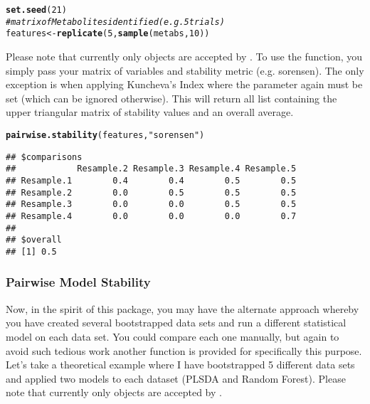\documentclass[12pt]{article}\usepackage[]{graphicx}\usepackage[usenames,dvipsnames]{color}
\makeatletter
\newcommand{\hlnum}[1]{\textcolor[rgb]{0.686,0.059,0.569}{#1}}%
\newcommand{\hlstr}[1]{\textcolor[rgb]{0.192,0.494,0.8}{#1}}%
\newcommand{\hlcom}[1]{\textcolor[rgb]{0.678,0.584,0.686}{\textit{#1}}}%
\newcommand{\hlstd}[1]{\textcolor[rgb]{0.345,0.345,0.345}{#1}}%
\newcommand{\hlkwb}[1]{\textcolor[rgb]{0.69,0.353,0.396}{#1}}%
\newcommand{\hlkwd}[1]{\textcolor[rgb]{0.737,0.353,0.396}{\textbf{#1}}}%
\newenvironment{kframe}{%
 \def\at@end@of@kframe{}%
 \ifinner\ifhmode%
  \def\at@end@of@kframe{\end{minipage}}%
  \begin{minipage}{\columnwidth}%
 \fi\fi%
 \def\FrameCommand##1{\hskip\@totalleftmargin \hskip-\fboxsep
 \colorbox{shadecolor}{##1}\hskip-\fboxsep
     \hskip-\linewidth \hskip-\@totalleftmargin \hskip\columnwidth}%
 \MakeFramed {\advance\hsize-\width
   \@totalleftmargin\z@ \linewidth\hsize
   \@setminipage}}%
 {\par\unskip\endMakeFramed%
 \at@end@of@kframe}
\newenvironment{knitrout}{}{} %
\makeatother
\begin{document}
\begin{knitrout}
\color{fgcolor}\begin{kframe}
\begin{alltt}
\hlkwd{set.seed}\hlstd{(}\hlnum{21}\hlstd{)}
\hlcom{# matrix of Metabolites identified (e.g. 5 trials)}
\hlstd{features} \hlkwb{<-} \hlkwd{replicate}\hlstd{(}\hlnum{5}\hlstd{,} \hlkwd{sample}\hlstd{(metabs,} \hlnum{10}\hlstd{))}
\end{alltt}
\end{kframe}
\end{knitrout}

Please note that currently only  objects are accepted by
.  To use the function, you simply pass your 
matrix of variables and stability metric (e.g. sorensen).  The only exception
is when applying Kuncheva's Index where the  parameter again must
be set (which can be ignored otherwise).  This will return all list containing 
the upper triangular matrix of stability values and an overall average.

\begin{knitrout}
\color{fgcolor}\begin{kframe}
\begin{alltt}
\hlkwd{pairwise.stability}\hlstd{(features,} \hlstr{"sorensen"}\hlstd{)}
\end{alltt}
\begin{verbatim}
## $comparisons
##            Resample.2 Resample.3 Resample.4 Resample.5
## Resample.1        0.4        0.4        0.5        0.5
## Resample.2        0.0        0.5        0.5        0.5
## Resample.3        0.0        0.0        0.5        0.5
## Resample.4        0.0        0.0        0.0        0.7
## 
## $overall
## [1] 0.5
\end{verbatim}
\end{kframe}
\end{knitrout}

\newpage
\subsubsection{Pairwise Model Stability}

Now, in the spirit of this package, you may have the alternate approach whereby
you have created several bootstrapped data sets and run a different statistical
model on each data set.  You could compare each one manually, but again to 
avoid such tedious work another function is provided for specifically this
purpose.  Let's take a theoretical example where I have bootstrapped 5 different
data sets and applied two models to each dataset (PLSDA and Random Forest).
Please note that currently only  objects are accepted by
.
\end{document}
